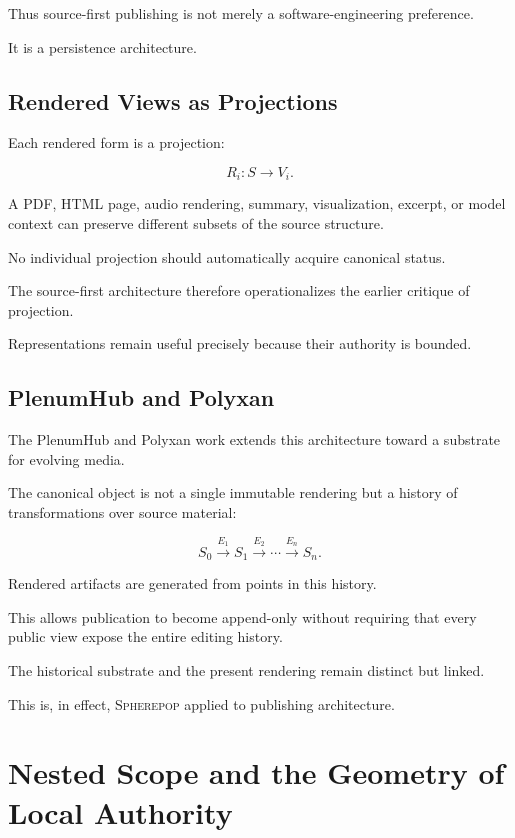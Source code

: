 \documentclass[11pt]{article}
\theoremstyle{remark}
\newcommand{\Spherepop}{\textsc{Spherepop}}
\begin{document}
Thus source-first publishing is not merely a software-engineering preference.

It is a persistence architecture.

\subsection{Rendered Views as Projections}

Each rendered form is a projection:

\begin{equation}
R_i:S\rightarrow V_i.
\end{equation}

A PDF, HTML page, audio rendering, summary, visualization, excerpt, or model context can preserve different subsets of the source structure.

No individual projection should automatically acquire canonical status.

The source-first architecture therefore operationalizes the earlier critique of projection.

Representations remain useful precisely because their authority is bounded.

\subsection{PlenumHub and Polyxan}

The PlenumHub and Polyxan work extends this architecture toward a substrate for evolving media.

The canonical object is not a single immutable rendering but a history of transformations over source material:

\begin{equation}
S_0
\xrightarrow{E_1}
S_1
\xrightarrow{E_2}
\cdots
\xrightarrow{E_n}
S_n.
\end{equation}

Rendered artifacts are generated from points in this history.

This allows publication to become append-only without requiring that every public view expose the entire editing history.

The historical substrate and the present rendering remain distinct but linked.

This is, in effect, \Spherepop{} applied to publishing architecture.

\section{Nested Scope and the Geometry of Local Authority}
\end{document}
